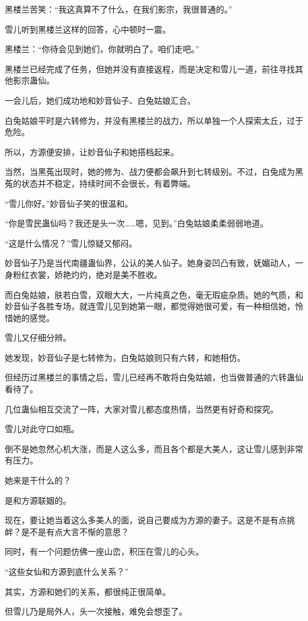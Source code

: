 \begin{this_body}
黑楼兰苦笑：“我这真算不了什么，在我们影宗，我很普通的。”

雪儿听到黑楼兰这样的回答，心中顿时一震。

黑楼兰：“你待会见到她们，你就明白了。咱们走吧。”

黑楼兰已经完成了任务，但她并没有直接返程，而是决定和雪儿一道，前往寻找其他影宗蛊仙。

一会儿后，她们成功地和妙音仙子、白兔姑娘汇合。

白兔姑娘平时是六转修为，并没有黑楼兰的战力，所以单独一个人探索太丘，过于危险。

所以，方源便安排，让妙音仙子和她搭档起来。

当然，当黑菟出现时，她的修为、战力便都会飙升到七转级别。不过，白兔成为黑菟的状态并不稳定，持续时间不会很长，有着弊端。

“雪儿你好。”妙音仙子笑的很温和。

“你是雪民蛊仙吗？我还是头一次……嗯，见到。”白兔姑娘柔柔弱弱地道。

“这是什么情况？”雪儿惊疑又郁闷。

妙音仙子乃是当代南疆蛊仙界，公认的美人仙子。她身姿凹凸有致，妩媚动人，一身粉红衣裳，娇艳灼灼，绝对是美不胜收。

而白兔姑娘，肤若白雪，双眼大大，一片纯真之色，毫无瑕疵杂质。她的气质，和妙音仙子各胜专场，就连雪儿见到她第一眼，都觉得她很可爱，有一种相信她，怜惜她的感觉。

雪儿又仔细分辨。

她发现，妙音仙子是七转修为，白兔姑娘则只有六转，和她相仿。

但经历过黑楼兰的事情之后，雪儿已经再不敢将白兔姑娘，也当做普通的六转蛊仙看待了。

几位蛊仙相互交流了一阵，大家对雪儿都态度热情，当然更有好奇和探究。

雪儿对此守口如瓶。

倒不是她忽然心机大涨，而是人这么多，而且各个都是大美人，这让雪儿感到非常有压力。

她来是干什么的？

是和方源联姻的。

现在，要让她当着这么多美人的面，说自己要成为方源的妻子。这是不是有点挑衅？是不是有点大言不惭的意思？

同时，有一个问题仿佛一座山峦，积压在雪儿的心头。

“这些女仙和方源到底什么关系？”

其实，方源和她们的关系，都很纯正很简单。

但雪儿乃是局外人，头一次接触，难免会想歪了。


\end{this_body}
